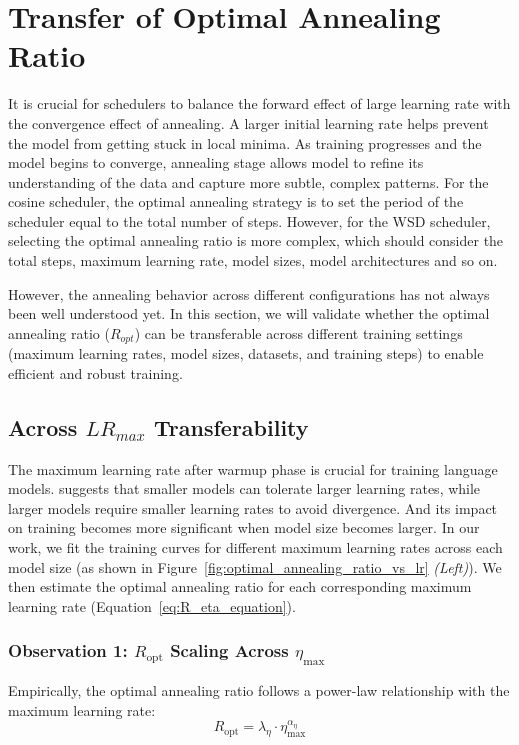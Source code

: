 \documentclass[letterpaper]{article} %
\begin{document}
\section{Transfer of Optimal Annealing Ratio}
It is crucial for schedulers to balance the forward effect of large learning rate with the convergence effect of annealing. A larger initial learning rate helps prevent the model from getting stuck in local minima. As training progresses and the model begins to converge, annealing stage allows model to refine its understanding of the data and capture more subtle, complex patterns. For the cosine scheduler, the optimal annealing strategy is to set the period of the scheduler equal to the total number of steps. However, for the WSD scheduler, selecting the optimal annealing ratio is more complex, which should consider the total steps, maximum learning rate, model sizes, model architectures and so on.


However, the annealing behavior across different configurations has not always been well understood yet. In this section, we will validate whether the optimal annealing ratio (\(R_{opt}\)) can be transferable across different training settings (maximum learning rates, model sizes, datasets, and training steps) to enable efficient and robust training.


\subsection{Across \textbf{\(LR_{max}\)} Transferability}

The maximum learning rate after warmup phase is crucial for training language models. \citet{Kaplan2020ScalingLF} suggests that smaller models can tolerate larger learning rates, while larger models require smaller learning rates to avoid divergence. And its impact on training becomes more significant when model size becomes larger. In our work, we fit the training curves for different maximum learning rates across each model size (as shown in Figure~\ref{fig:optimal_annealing_ratio_vs_lr} \emph{(Left)}). We then estimate the optimal annealing ratio for each corresponding maximum learning rate (Equation~\ref{eq:R_eta_equation}). 

\subsubsection*{Observation 1: $R_{\text{opt}}$ Scaling Across $\eta_{\max}$}

Empirically, the optimal annealing ratio follows a power-law relationship with the maximum learning rate:
\begin{equation}
	R_{\text{opt}} = \lambda_{\eta} \cdot \eta_{\max}^{\alpha_{\eta}}
	\label{eq:R_eta_equation}
\end{equation}
\end{document}
